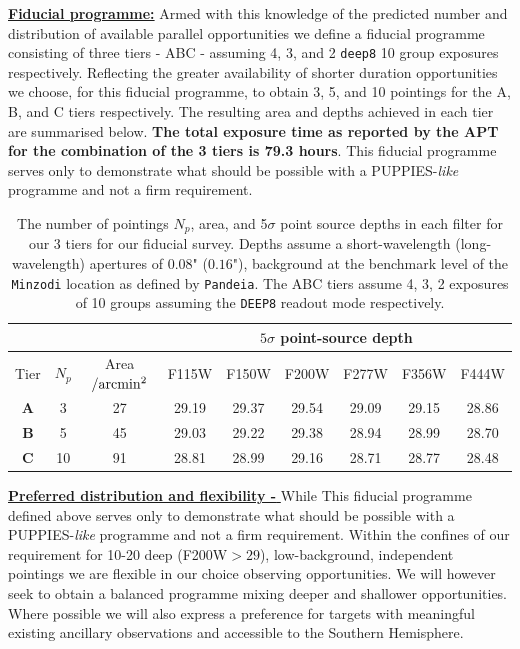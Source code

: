 \documentclass[12pt]{article}
\begin{document}
\vspace{5mm}
\noindent
\underline{\bf Fiducial programme:} Armed with this knowledge of the predicted number and distribution of available parallel opportunities we define a fiducial programme consisting of three tiers - ABC - assuming 4, 3, and 2 \texttt{deep8} 10 group exposures respectively. Reflecting the greater availability of shorter duration opportunities we choose, for this fiducial programme, to obtain 3, 5, and 10 pointings for the A, B, and C tiers respectively. The resulting area and depths achieved in each tier are summarised below. \textbf{The total exposure time as reported by the APT for the combination of the 3 tiers is 79.3 hours}. This fiducial programme serves only to demonstrate what should be possible with a PUPPIES-\emph{like} programme and not a firm requirement.

\begin{table}[h!]
\footnotesize
\begin{center}
\begin{tabular}{ |c|c|c|c|c|c|c|c|c| } 
\hline
\multicolumn{3}{|c|}{} & \multicolumn{6}{|c|}{$5\sigma$ point-source depth} \\
 \hline
Tier & $N_{p}$ & Area$/{\rm arcmin^2}$ & F115W & F150W & F200W & F277W & F356W & F444W \\
\hline
\textbf{A} & 3 & 27 & 29.19 & 29.37 & 29.54 & 29.09 & 29.15 & 28.86 \\
\textbf{B} & 5 & 45 & 29.03 & 29.22 & 29.38 & 28.94 & 28.99 & 28.70 \\
\textbf{C} & 10 & 91 & 28.81 & 28.99 & 29.16 & 28.71 & 28.77 & 28.48 \\
\hline
\end{tabular}
\end{center}
\vspace{-5mm}
\caption{The number of pointings $N_p$, area, and 5$\sigma$ point source depths in each filter for our 3 tiers for our fiducial survey.  Depths assume a short-wavelength (long-wavelength) apertures of $0.08$" ($0.16$"), background at the benchmark level of the \texttt{Minzodi} location as defined by \texttt{Pandeia}. The ABC tiers assume 4, 3, 2 exposures of 10 groups assuming the \texttt{DEEP8} readout mode respectively.}
\end{table}

\vspace{5mm}
\noindent
\underline{\bf Preferred distribution and flexibility - } While 
This fiducial programme defined above serves only to demonstrate what should be possible with a PUPPIES-\emph{like} programme and not a firm requirement. Within the confines of our requirement for 10-20 deep (F200W$>29$), low-background, independent pointings we are flexible in our choice observing opportunities. We will however seek to obtain a balanced programme mixing deeper and shallower opportunities. Where possible we will also express a preference for targets with meaningful existing ancillary observations and accessible to the Southern Hemisphere.
\end{document}
